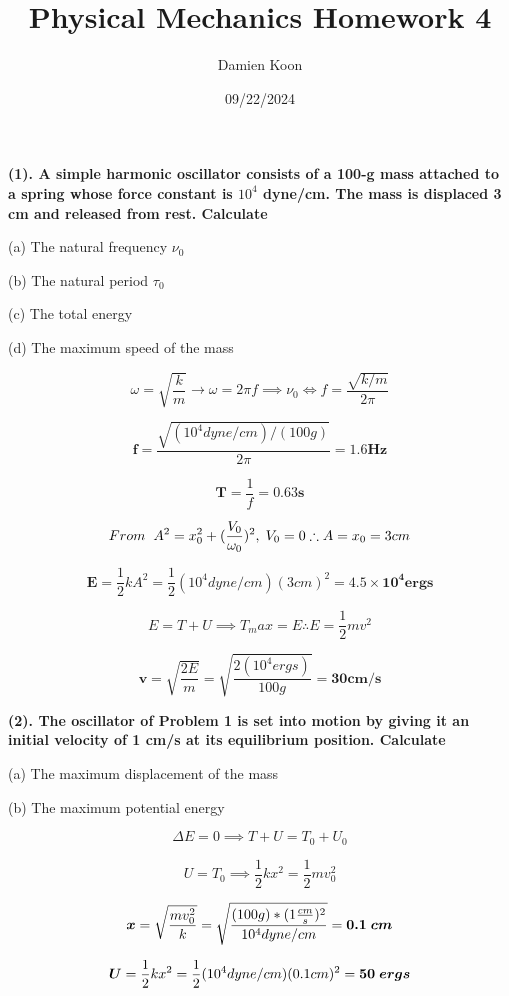 \documentclass[12pt]{article}
\title{Physical Mechanics Homework 4}
\date{09/22/2024}
\author{Damien Koon}
\begin{document}
\maketitle

\newpage
\textbf{
(1). A simple harmonic oscillator consists of a 100-g mass attached to
a spring whose force constant is $10^4$ dyne/cm. The mass is displaced 3 cm and released from rest. Calculate
}

(a) The natural frequency $\nu_0$

(b) The natural period $\tau_0$

(c) The total energy

(d) The maximum speed of the mass

$$
\omega = \sqrt{\frac{k}{m}} \rightarrow \omega = 2 \pi f \implies \nu_0 \Leftrightarrow f = \frac{\sqrt{k/m}}{2\pi}
$$

$$
\boldsymbol{f} = \frac{\sqrt{(10^4 dyne/cm)/(100 g)}}{2 \pi} = \boldsymbol{1.6 Hz}
$$

$$
\boldsymbol{T} = \frac{1}{f} = \boldsymbol{0.63 s}
$$

$$
From \hspace{0.2cm} A^2 = x_0^2 + (\frac{V_0}{\omega_0})^2, \hspace{0.1cm} V_0 = 0 \therefore A = x_0 = 3 cm
$$

$$
\boldsymbol{E} = \frac{1}{2}kA^2 = \frac{1}{2}(10^4 dyne/cm)(3 cm)^2 = \boldsymbol{4.5 \times 10^4 ergs}
$$

$$
E = T + U \implies T_max = E \therefore E = \frac{1}{2}mv^2
$$

$$
\boldsymbol{v} = \sqrt{\frac{2E}{m}} = \sqrt{\frac{2(10^4 ergs)}{100 g}} = \boldsymbol{30 cm/s}
$$

\newpage
\textbf{
(2). The oscillator of Problem 1 is set into motion by giving it an initial velocity of 1 cm/s at its equilibrium position. Calculate
}

(a) The maximum displacement of the mass

(b) The maximum potential energy

$$
\Delta E = 0 \implies T + U = T_0 + U_0
$$


$$
U = T_0 \implies \frac{1}{2} k x^2 = \frac{1}{2} m v_0^2
$$

$$
\boldsymbol{x} = \sqrt{\frac{m v_0^2}{k}} = \sqrt{\frac{(100 g) * (1 \frac{cm}{s})^2}{10^4 dyne/cm}} = \boldsymbol{0.1 \hspace{0.1cm} cm}
$$

$$
\boldsymbol{U} = \frac{1}{2} k x^2 = \frac{1}{2}(10^4 dyne/cm)(0.1cm)^2 = \boldsymbol{50 \hspace{0.1cm} ergs}
$$
\end{document}
